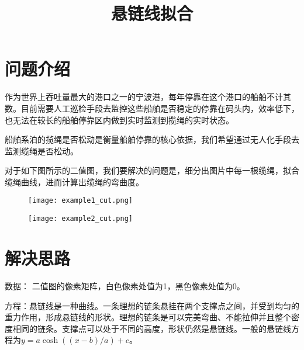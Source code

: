 \documentclass{article}
\title{悬链线拟合}
\author{}
\date{}
\begin{document}
\maketitle



\section{问题介绍}

作为世界上吞吐量最大的港口之一的宁波港，每年停靠在这个港口的船舶不计其数。目前需要人工巡检手段去监控这些船舶是否稳定的停靠在码头内，效率低下，也无法在较长的船舶停靠区内做到实时监测到揽绳的实时状态。

船舶系泊的揽绳是否松动是衡量船舶停靠的核心依据，我们希望通过无人化手段去监测缆绳是否松动。

对于如下图所示的二值图，我们要解决的问题是，细分出图片中每一根缆绳，拟合缆绳曲线，进而计算出缆绳的弯曲度。

\begin{figure}[H]
\begin{minipage}{0.48\linewidth}
  \centerline{\texttt{[image: example1\_cut.png]}}
\end{minipage}
\hfill
\begin{minipage}{0.48\linewidth}
  \centerline{\texttt{[image: example2\_cut.png]}}
\end{minipage}
\end{figure}


\section{解决思路}

数据： 二值图的像素矩阵，白色像素处值为1，黑色像素处值为0。

方程：悬链线是一种曲线。一条理想的链条悬挂在两个支撑点之间，并受到均匀的重力作用，形成悬链线的形状。理想的链条是可以完美弯曲、不能拉伸并且整个密度相同的链条。支撑点可以处于不同的高度，形状仍然是悬链线。一般的悬链线方程为\(y = a \cosh((x-b)/a) + c\)。
\end{document}
